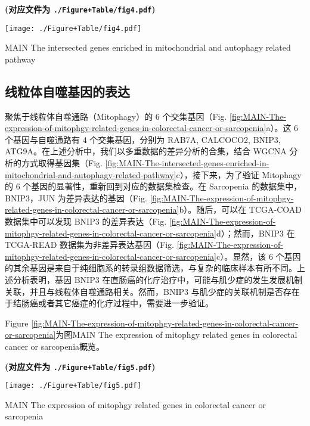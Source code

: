\documentclass[
]{article}
\begin{document}
\textbf{(对应文件为 \texttt{./Figure+Table/fig4.pdf})}

\def\@captype{figure}
\begin{center}
\texttt{[image: ./Figure+Table/fig4.pdf]}
\caption{MAIN The intersected genes enriched in mitochondrial and autophagy related pathway}\label{fig:MAIN-The-intersected-genes-enriched-in-mitochondrial-and-autophagy-related-pathway}
\end{center}

\hypertarget{ux7ebfux7c92ux4f53ux81eaux566cux57faux56e0ux7684ux8868ux8fbe}{%
\subsection{线粒体自噬基因的表达}\label{ux7ebfux7c92ux4f53ux81eaux566cux57faux56e0ux7684ux8868ux8fbe}}

聚焦于线粒体自噬通路（Mitophagy）的 6 个交集基因（Fig. \ref{fig:MAIN-The-expression-of-mitophgy-related-genes-in-colorectal-cancer-or-sarcopenia}a）。这 6 个基因与自噬通路有 4 个交集基因，分别为 RAB7A, CALCOCO2, BNIP3, ATG9A。在上述分析中，我们以多重数据的差异分析的合集，结合 WGCNA 分析的方式取得基因集（Fig. \ref{fig:MAIN-The-intersected-genes-enriched-in-mitochondrial-and-autophagy-related-pathway}c），接下来，为了验证 Mitophagy 的 6 个基因的显著性，重新回到对应的数据集检查。在 Sarcopenia 的数据集中，BNIP3，JUN 为差异表达的基因（Fig. \ref{fig:MAIN-The-expression-of-mitophgy-related-genes-in-colorectal-cancer-or-sarcopenia}b）。随后，可以在 TCGA-COAD 数据集中可以发现 BNIP3 的差异表达（Fig. \ref{fig:MAIN-The-expression-of-mitophgy-related-genes-in-colorectal-cancer-or-sarcopenia}d）；然而，BNIP3 在 TCGA-READ 数据集为非差异表达基因（Fig. \ref{fig:MAIN-The-expression-of-mitophgy-related-genes-in-colorectal-cancer-or-sarcopenia}c）。显然，该 6 个基因的其余基因是来自于纯细胞系的转录组数据筛选，与复杂的临床样本有所不同。上述分析表明，基因 BNIP3 在直肠癌的化疗治疗中，可能与肌少症的发生发展机制关联，并且与线粒体自噬通路相关。然而，BNIP3 与肌少症的关联机制是否存在于结肠癌或者其它癌症的化疗过程中，需要进一步验证。

Figure \ref{fig:MAIN-The-expression-of-mitophgy-related-genes-in-colorectal-cancer-or-sarcopenia}为图MAIN The expression of mitophgy related genes in colorectal cancer or sarcopenia概览。

\textbf{(对应文件为 \texttt{./Figure+Table/fig5.pdf})}

\def\@captype{figure}
\begin{center}
\texttt{[image: ./Figure+Table/fig5.pdf]}
\caption{MAIN The expression of mitophgy related genes in colorectal cancer or sarcopenia}\label{fig:MAIN-The-expression-of-mitophgy-related-genes-in-colorectal-cancer-or-sarcopenia}
\end{center}
\end{document}
